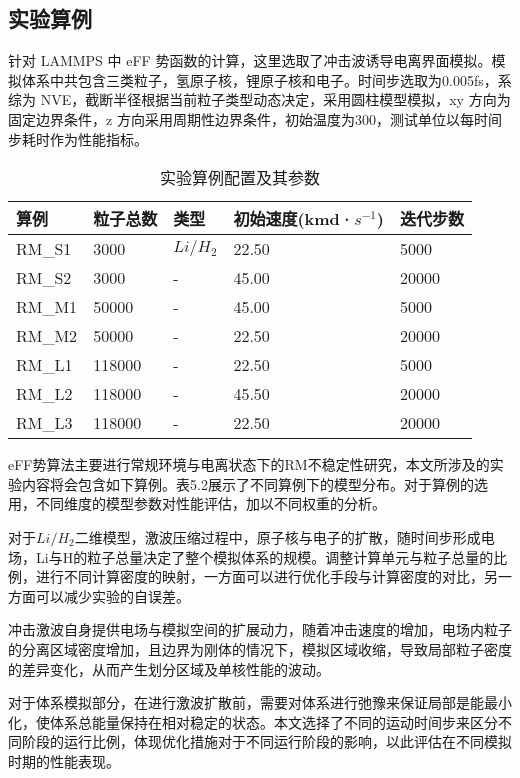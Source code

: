 \subsection{实验算例}
针对 LAMMPS 中 eFF 势函数的计算，这里选取了冲击波诱导电离界面模拟。模拟体系中共包含三类粒子，氢原子核，锂原子核和电子。时间步选取为0.005fs，系综为 NVE，截断半径根据当前粒子类型动态决定，采用圆柱模型模拟，xy 方向为固定边界条件，z 方向采用周期性边界条件，初始温度为300，测试单位以每时间步耗时作为性能指标。

\begin{table}[]
  \centering
  \caption{实验算例配置及其参数}
  \renewcommand{\arraystretch}{1.5}
\begin{tabular}{lllll}
\hline
算例     & 粒子总数   & 类型    & 初始速度(kmd·$s^{-1}$) & 迭代步数  \\ \hline
RM\_S1 & 3000   & $Li/H_2$ & 22.50         & 5000  \\
RM\_S2 & 3000   & - & 45.00         & 20000 \\
RM\_M1 & 50000  & - & 45.00         & 5000  \\
RM\_M2 & 50000  & - & 22.50         & 20000 \\
RM\_L1 & 118000 & - & 22.50         & 5000  \\
RM\_L2 & 118000 & - & 45.50         & 20000 \\
RM\_L3 & 118000 & - & 22.50         & 20000 \\ \hline
\end{tabular}
\end{table}

eFF势算法主要进行常规环境与电离状态下的RM不稳定性研究，本文所涉及的实验内容将会包含如下算例。表5.2展示了不同算例下的模型分布。对于算例的选用，不同维度的模型参数对性能评估，加以不同权重的分析。

对于$Li/H_2$二维模型，激波压缩过程中，原子核与电子的扩散，随时间步形成电场，Li与H的粒子总量决定了整个模拟体系的规模。调整计算单元与粒子总量的比例，进行不同计算密度的映射，一方面可以进行优化手段与计算密度的对比，另一方面可以减少实验的自误差。

冲击激波自身提供电场与模拟空间的扩展动力，随着冲击速度的增加，电场内粒子的分离区域密度增加，且边界为刚体的情况下，模拟区域收缩，导致局部粒子密度的差异变化，从而产生划分区域及单核性能的波动。

对于体系模拟部分，在进行激波扩散前，需要对体系进行弛豫来保证局部是能最小化，使体系总能量保持在相对稳定的状态。本文选择了不同的运动时间步来区分不同阶段的运行比例，体现优化措施对于不同运行阶段的影响，以此评估在不同模拟时期的性能表现。

